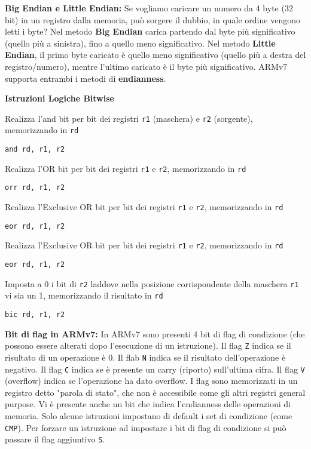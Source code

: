 \begin{defn}
\textbf{Big Endian e Little Endian:} Se vogliamo caricare un numero da 4 byte (32 bit) in un registro dalla memoria, può sorgere il dubbio, in quale ordine vengono letti i byte? Nel metodo \textbf{Big Endian} carica partendo dal byte più significativo (quello più a sinistra), fino a quello meno significativo. Nel metodo \textbf{Little Endian}, il primo byte caricato è quello meno significativo (quello più a destra del registro/numero), mentre l'ultimo caricato è il byte più significativo. ARMv7 supporta entrambi i metodi di \textbf{endianness}.
\end{defn}

\begin{defn}
\textbf{Istruzioni Logiche Bitwise}

Realizza l'and bit per bit dei registri \texttt{r1} (maschera) e \texttt{r2} (sorgente), memorizzando in \texttt{rd}
\begin{lstlisting}[style=arm]
and rd, r1, r2
\end{lstlisting}

Realizza l'OR bit per bit dei registri \texttt{r1} e \texttt{r2}, memorizzando in \texttt{rd}
\begin{lstlisting}[style=arm]
orr rd, r1, r2
\end{lstlisting}

Realizza l'Exclusive OR bit per bit dei registri \texttt{r1} e \texttt{r2}, memorizzando in \texttt{rd}
\begin{lstlisting}[style=arm]
eor rd, r1, r2
\end{lstlisting}

Realizza l'Exclusive OR bit per bit dei registri \texttt{r1} e \texttt{r2}, memorizzando in \texttt{rd}
\begin{lstlisting}[style=arm]
eor rd, r1, r2
\end{lstlisting}

Imposta a 0 i bit di \texttt{r2} laddove nella posizione corrispondente della maschera \texttt{r1} vi sia un 1, memorizzando il risultato in \texttt{rd}
\begin{lstlisting}[style=arm]
bic rd, r1, r2
\end{lstlisting}
\end{defn}

\begin{defn}
\textbf{Bit di flag in ARMv7:}
In ARMv7 sono presenti 4 bit di flag di condizione (che possono essere alterati dopo l'esecuzione di un istruzione). Il flag \texttt{Z} indica se il risultato di un operazione è 0. Il flab \texttt{N} indica se il risultato dell'operazione è negativo. Il flag \texttt{C} indica se è presente un carry (riporto) sull'ultima cifra. Il flag \texttt{V} (overflow) indica se l'operazione ha dato overflow. I flag sono memorizzati in un registro detto "parola di stato", che non è accessibile come gli altri registri general purpose. Vi è presente anche un bit che indica l'endianness delle operazioni di memoria.
Solo alcune istruzioni impostano di default i set di condizione (come \texttt{CMP}). Per forzare un istruzione ad impostare i bit di flag di condizione si può passare il flag aggiuntivo \texttt{S}.
\end{defn}

